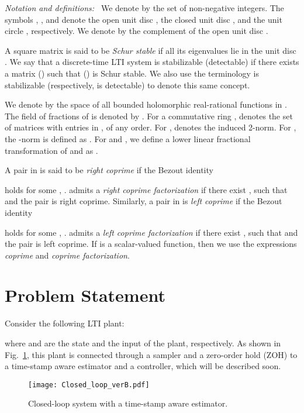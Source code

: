\documentclass[letterpaper, 12pt, draftcls, onecolumn]{ieeeconf}
\begin{document}
{\it Notation and definitions:~}
We denote by  the set of non-negative integers.
The symbols 
, , and  denote
the open unit disc ,
the closed unit disc , and
the unit circle , respectively.
We denote by  the complement of the open unit disc
.


A square matrix  is said to be {\em Schur stable}
if all its eigenvalues lie in the unit disc .
We say that a discrete-time LTI system 
is stabilizable (detectable) if 
there exists a matrix  () such that  () is Schur stable.
We also use the terminology  is 
stabilizable (respectively,  is detectable) to denote
this same concept.

We denote by  the space of all bounded holomorphic
real-rational
functions in .
The field of fractions of 
 is denoted by .
For a commutative ring , 
 denotes the set of
matrices with entries in , of any order.
For ,
 denotes the induced 2-norm.
For ,
the -norm is defined as .
For  and
,
we define a lower linear fractional transformation of  and 
as
.


A pair  in  is said to be 
{\em right coprime} if  the Bezout identity 

holds for some , .
 admits a {\em right coprime
	factorization} if there exist ,  
such that 
 and the pair  is right coprime.
Similarly, a pair  
in  
is {\em left coprime} if the Bezout identity 

holds for some , .
 admits a {\em left coprime
	factorization} if there exist ,  
such that  and the pair 
 is left coprime.
If  is a scalar-valued function, then we use the expressions {\em coprime} and
{\em coprime factorization}. 











\section{Problem Statement}
Consider the following LTI plant:

where  and
 are the state and the input of the plant, respectively.
As shown in 
Fig.~\ref{fig:CLS},
this plant is connected 
through a sampler and a zero-order hold (ZOH)
to a time-stamp aware estimator and a controller,
which will be described soon.
\begin{figure}[tb]
	\centering
	\texttt{[image: Closed\_loop\_verB.pdf]}
	\caption{Closed-loop system with a time-stamp aware estimator.}
	\label{fig:CLS}
\end{figure}
\end{document}
